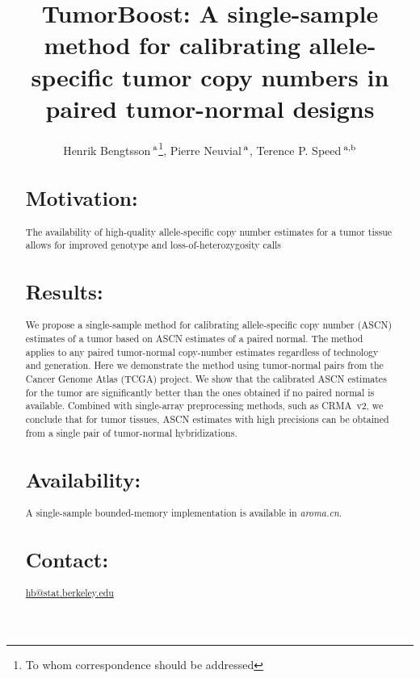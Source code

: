 \documentclass[]{bioinfo}
\newcommand{\pkg}[1]{\textit{#1}\xspace}
\begin{document}

\title[TumorBoost]{TumorBoost: A single-sample method for calibrating allele-specific tumor copy numbers in paired tumor-normal designs}
\author[Bengtsson et al.]{Henrik Bengtsson\,$^{\rm a}$\footnote{To whom correspondence should be addressed}, Pierre Neuvial\,$^{\rm a}$, Terence P. Speed\,$^{\rm a,b}$}
\address{
  $^{\rm a}$ Department of Statistics, University of California, Berkeley, USA.
  $^{\rm b}$ Bioinformatics Division, Walter \& Eliza Hall Institute of Medical Research, Parkville, Australia.
} 



\maketitle

\begin{abstract}
\section{Motivation:}
The availability of high-quality allele-specific copy number estimates for a tumor tissue allows for improved genotype and loss-of-heterozygosity calls

\section{Results:}
We propose a single-sample method for calibrating allele-specific copy number (ASCN) estimates of a tumor based on ASCN estimates of a paired normal.  
The method applies to any paired tumor-normal copy-number estimates regardless of technology and generation.
Here we demonstrate the method using tumor-normal pairs from the Cancer Genome Atlas (TCGA) project. 
We show that the calibrated ASCN estimates for the tumor are significantly better than the ones obtained if no paired normal is available.
Combined with single-array preprocessing methods, such as CRMA~v2, we conclude that for tumor tissues, ASCN estimates with high precisions can be obtained from a single pair of tumor-normal hybridizations.

\section{Availability:}
A single-sample bounded-memory implementation is available in \pkg{aroma.cn}.


\section{Contact:} 
\href{hb@stat.berkeley.edu}{hb@stat.berkeley.edu}
\end{abstract}
\end{document}
